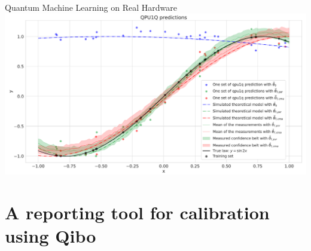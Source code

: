 \documentclass[11p,aspectratio=169]{beamer}
\begin{document}
\begin{frame}{Quantum Machine Learning on Real Hardware}
\includegraphics[width=\textwidth]{figures/cropped_qpu_not_normed..pdf}
\end{frame}



\section{A reporting tool for calibration using Qibo}
\end{document}
